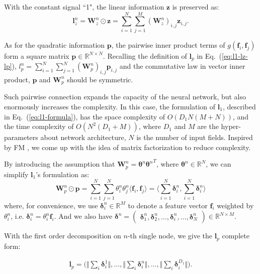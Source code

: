 \documentclass[conference]{IEEEtran}
\newcommand{\bs}{\boldsymbol}
\newcommand{\bW}{\bs{W}}
\newcommand{\bl}{\bs{l}}
\newcommand{\bz}{\bs{z}}
\newcommand{\bp}{\bs{p}}
\newcommand{\Bf}{\bs{f}}
\newcommand{\btheta}{\bs{\theta}}
\newcommand{\mR}{\mathbb{R}}
\begin{document}
With the constant signal ``1", the linear information $\bz$ is preserved as:
\begin{equation}\label{eq:lz}
\bl_z^n = \bW_z^n \odot \bz = \sum_{i=1}^{N} {\sum_{j=1}^{M} {(\bW_z^n)_{i,j} \bz_{i,j}}}.
\end{equation}

As for the quadratic information $\bp$, the pairwise inner product terms of $g(\Bf_i, \Bf_j)$ form a square matrix $\bp \in \mR^{N \times N}$.
Recalling the definition of $\bl_p$ in Eq.~(\ref{eq:l1-lz-lp}), $l_p^n = \sum_{i = 1}^{N} \sum_{j = 1}^{N} (\bW_p^n)_{i, j} \bp_{i, j}$ and the commutative law in vector inner product, $\bp$ and $\bW_p^n$ should be symmetric.

Such pairwise connection expands the capacity of the neural network, but also enormously increases the complexity.
In this case, the formulation of $\bl_1$, described in Eq.~(\ref{eq:l1-formula}), has the space complexity of $O(D_1 N (M + N))$, and the time complexity of $O(N^2(D_1 + M))$, where $D_1$ and $M$ are the hyper-parameters about network architecture, $N$ is the number of input fields.
Inspired by FM \cite{rendle2010factorization}, we come up with the idea of matrix factorization to reduce complexity.





By introducing the assumption that $\bW_p^n = \btheta^n {\btheta^n}^T$, where $ \btheta^n \in \mR^N$, we can simplify $\bl_1$'s formulation as:
\begin{equation}
\bW_p^n \odot \bp = \sum_{i=1}^N {\sum_{j=1}^N \theta^n_i \theta^n_j \langle \Bf_i, \Bf_j \rangle} = \langle \sum_{i=1}^N\bs\delta^n_i, \sum_{i=1}^N\bs\delta^n_i \rangle
\end{equation}
where, for convenience, we use $\bs\delta^n_i \in \mR^M$ to denote a feature vector $\Bf_i$ weighted by $\theta^n_i$, i.e. $\bs\delta^n_i = \theta^n_i \Bf_i$. And we also have $\bs\delta^n = \begin{pmatrix} \bs\delta^n_1, \bs\delta^n_2, \ldots, \bs\delta^n_i, \ldots, \bs\delta^n_N \end{pmatrix} \in \mR^{N \times M}$.


With the first order decomposition on $n$-th single node, we give the $\bl_p$ complete form:


\begin{equation}\label{eq:pnn1_lp}
\begin{split}
\bl_p = \Big( \Vert \sum_i \bs\delta_i^1 \Vert, \ldots, \Vert \sum_i \bs\delta_i^{n} \Vert, \ldots, \Vert \sum_i \bs\delta_i^{D_1} \Vert \Big).
\end{split}
\end{equation}
\end{document}
